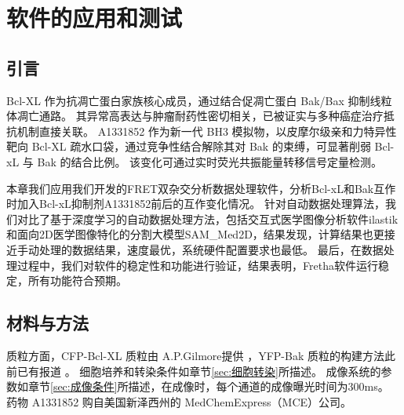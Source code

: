 \chapter{软件的应用和测试}

\section{引言}
\ifshowtext

Bcl-XL 作为抗凋亡蛋白家族核心成员，通过结合促凋亡蛋白 Bak/Bax 抑制线粒体凋亡通路。
其异常高表达与肿瘤耐药性密切相关，已被证实与多种癌症治疗抵抗机制直接关联。
A1331852 作为新一代 BH3 模拟物，以皮摩尔级亲和力特异性靶向 Bcl-XL 疏水口袋，通过竞争性结合解除其对 Bak 的束缚，可显著削弱 Bcl-xL 与 Bak 的结合比例。
该变化可通过实时荧光共振能量转移信号定量检测。

本章我们应用我们开发的FRET双杂交分析数据处理软件，分析Bcl-xL和Bak互作时加入Bcl-xL抑制剂A1331852前后的互作变化情况。
针对自动数据处理算法，我们对比了基于深度学习的自动数据处理方法，包括交互式医学图像分析软件ilastik和面向2D医学图像特化的分割大模型SAM\_Med2D，结果发现，计算结果也更接近手动处理的数据结果，速度最优，系统硬件配置要求也最低。
最后，在数据处理过程中，我们对软件的稳定性和功能进行验证，结果表明，Fretha软件运行稳定，所有功能符合预期。

\fi

\section{材料与方法}

质粒方面，CFP-Bcl-XL 质粒由 A.P.Gilmore提供 ，YFP-Bak 质粒的构建方法此前已有报道 。
细胞培养和转染条件如章节\ref{sec:细胞转染}所描述。
成像系统的参数如章节\ref{sec:成像条件}所描述，在成像时，每个通道的成像曝光时间为300ms。
药物 A1331852 购自美国新泽西州的 MedChemExpress（MCE）公司。

